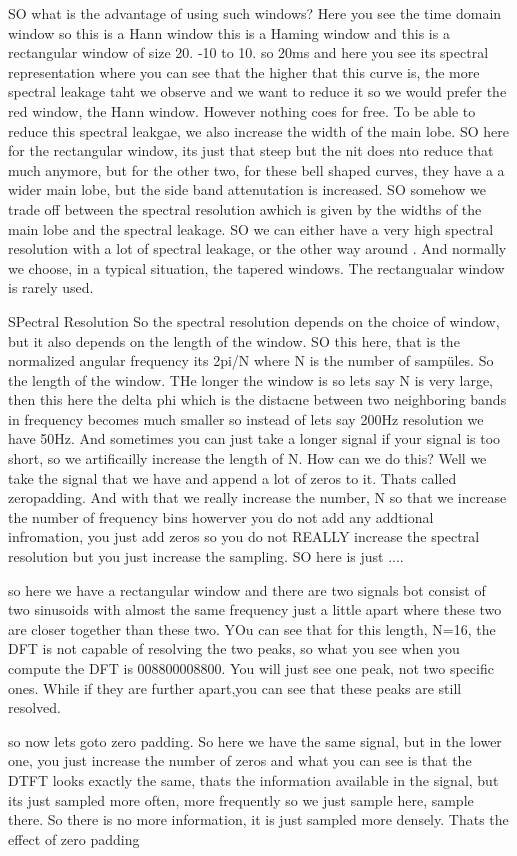 SO what is the advantage of using such windows? Here you see the time domain window so this is a Hann window this is a Haming window and this is a rectangular window of size 20.  -10 to 10.   so 20ms and here you see its spectral representation where you can see that the higher that this curve is, the more spectral leakage taht we observe and we want to reduce it so we would prefer the red window, the Hann window. However  nothing coes for free. To be able to reduce this spectral leakgae, we also increase the width of the main lobe.  SO here for the rectangular window, its just that steep but the nit does nto reduce that much anymore, but for the other two, for these bell shaped curves, they have a a wider main lobe, but the side band attenutation is increased.  SO somehow we trade off between the spectral resolution awhich is given by the widths of the main lobe and the spectral leakage. SO we can either have a very high spectral resolution with a lot of spectral leakage, or the other way around .  And normally we choose, in a typical situation, the tapered windows.  The rectangualar window is rarely used. 

SPectral Resolution
So the spectral resolution depends on the choice of window, but it also depends on the length of the window.  SO this here, that is the normalized angular frequency its 2pi/N where N is the number of sampüles.  So the length of the window. THe longer the window is so lets say N is very large, then this here the delta phi which is the distacne  between two neighboring bands in frequency becomes much smaller so instead of lets say 200Hz resolution we have 50Hz.  And sometimes you can just take a longer signal if your signal is too short, so we artificailly increase the length of N. How can we do this? Well we take the signal that we have and append a lot of zeros to it.  Thats called zeropadding.  And with that we really increase the number, N so that we increase the number of frequency bins howerver you do not add any addtional infromation, you just add zeros so you do not REALLY increase the spectral resolution but you just increase the sampling. SO here is just ....

so here we have a rectangular window and there are two signals bot consist of two sinusoids with almost the same frequency just a little apart where these two are closer together than these two. YOu can see that for this length, N=16, the DFT is not capable of resolving the two peaks, so what you see when you compute the DFT is 008800008800. You will just see one peak, not two specific ones. While if they are further apart,you can see that these peaks are still resolved.  

so now lets goto zero padding.  So here we have the same signal, but in the lower one, you just increase the number of zeros and what you can see is that the DTFT looks exactly the same, thats the information available in the signal, but its just sampled more often, more frequently so we just sample here, sample there.  So there is no more information, it is just sampled more densely.  Thats the effect of zero padding
